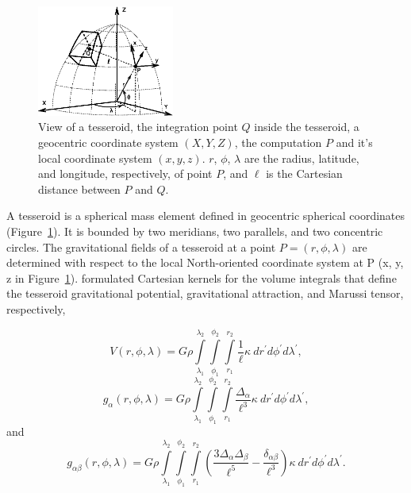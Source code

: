 \documentclass[paper,twocolumn]{geophysics}
\begin{document}
\begin{figure}
    \centering
    \includegraphics[width=0.4\textwidth]{figs/tesseroid}
    \caption{
        View of a tesseroid,
        the integration point $Q$ inside the tesseroid,
        a geocentric coordinate system $(X, Y, Z)$,
        the computation $P$ and it's local coordinate system $(x, y, z)$.
        $r$, $\phi$, $\lambda$ are
        the radius, latitude, and longitude, respectively, of point $P$,
        and $\ell$ is the Cartesian distance between $P$ and $Q$.
    }
    \label{fig:tesseroid}
\end{figure}

A tesseroid is a spherical mass element defined in geocentric spherical
coordinates
(Figure~\ref{fig:tesseroid}).
It is bounded by two meridians, two parallels, and two concentric circles.
The gravitational fields of a tesseroid at a point $P = (r,\phi,\lambda)$
are determined with respect to the local North-oriented coordinate system at
P (x, y, z in Figure~\ref{fig:tesseroid}).
\citet{Grombein2013} formulated Cartesian kernels for the volume integrals
that define the tesseroid gravitational potential, gravitational attraction,
and Marussi tensor, respectively,

\begin{equation}
    V(r,\phi,\lambda) = G \rho
        \int\limits_{\lambda_1}^{\lambda_2}
        \int\limits_{\phi_1}^{\phi_2}
        \int\limits_{r_1}^{r_2}
        \frac{1}{\ell}
        \kappa\  dr^\prime d\phi^\prime d\lambda^\prime,
    \label{eq:tesspot}
\end{equation}
\begin{equation}
    g_{\alpha}(r,\phi,\lambda) = G \rho
        \int\limits_{\lambda_1}^{\lambda_2}
        \int\limits_{\phi_1}^{\phi_2}
        \int\limits_{r_1}^{r_2}
        \frac{\Delta_\alpha}{\ell^3}
        \kappa\ dr^\prime d\phi^\prime d\lambda^\prime,
    \label{eq:tessgrav}
\end{equation}
\noindent
and
\begin{equation}
    g_{\alpha\beta}(r,\phi,\lambda) = G \rho
        \int\limits_{\lambda_1}^{\lambda_2}
        \int\limits_{\phi_1}^{\phi_2}
        \int\limits_{r_1}^{r_2}
        \left(
            \frac{3\Delta_{\alpha} \Delta_{\beta}}{\ell^5} -
            \frac{\delta_{\alpha\beta}}{\ell^3}
        \right)
        \kappa\ dr^\prime d\phi^\prime d\lambda^\prime.
    \label{eq:tesstensor}
\end{equation}
\end{document}
